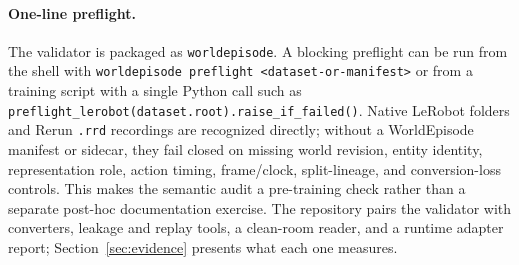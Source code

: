 \paragraph{One-line preflight.}
The validator is packaged as \texttt{worldepisode}. A blocking preflight can be run from the shell
with \texttt{worldepisode preflight <dataset-or-manifest>} or from a training script with a single
Python call such as \texttt{preflight\_lerobot(dataset.root).raise\_if\_failed()}. Native LeRobot
folders and Rerun \texttt{.rrd} recordings are recognized directly; without a WorldEpisode
manifest or sidecar, they fail closed on missing world revision, entity identity, representation
role, action timing, frame/clock, split-lineage, and conversion-loss controls. This makes the
semantic audit a pre-training check rather than a separate post-hoc documentation exercise. The
repository pairs the validator with converters, leakage and replay tools, a clean-room reader, and
a runtime adapter report; Section~\ref{sec:evidence} presents what each one measures.
